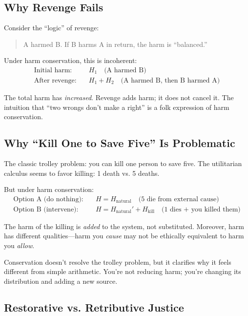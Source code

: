 \documentclass[12pt,letterpaper]{article}
\theoremstyle{definition}
\theoremstyle{remark}
\begin{document}
\subsection{Why Revenge Fails}

Consider the ``logic'' of revenge:
\begin{quote}
A harmed B. If B harms A in return, the harm is ``balanced.''
\end{quote}

Under harm conservation, this is incoherent:
\begin{align}
\text{Initial harm:} \quad & H_1 \quad \text{(A harmed B)} \\
\text{After revenge:} \quad & H_1 + H_2 \quad \text{(A harmed B, then B harmed A)}
\end{align}

The total harm has \textit{increased}. Revenge adds harm; it does not cancel it. The intuition that ``two wrongs don't make a right'' is a folk expression of harm conservation.

\subsection{Why ``Kill One to Save Five'' Is Problematic}

The classic trolley problem: you can kill one person to save five. The utilitarian calculus seems to favor killing: 1 death vs. 5 deaths.

But under harm conservation:
\begin{align}
\text{Option A (do nothing):} \quad & H = H_{\text{natural}} \quad \text{(5 die from external cause)} \\
\text{Option B (intervene):} \quad & H = H_{\text{natural}}' + H_{\text{kill}} \quad \text{(1 dies + you killed them)}
\end{align}

The harm of the killing is \textit{added} to the system, not substituted. Moreover, harm has different qualities---harm you \textit{cause} may not be ethically equivalent to harm you \textit{allow}.

Conservation doesn't resolve the trolley problem, but it clarifies why it feels different from simple arithmetic. You're not reducing harm; you're changing its distribution and adding a new source.

\subsection{Restorative vs. Retributive Justice}
\end{document}
